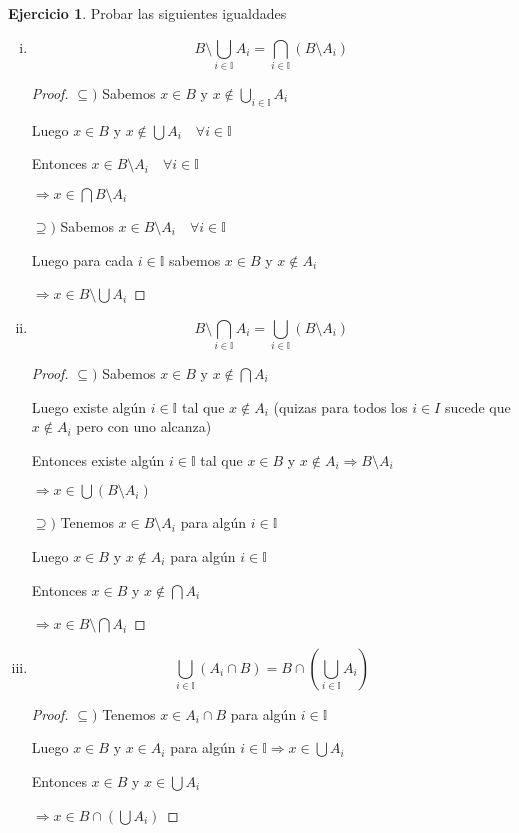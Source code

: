 \documentclass[12pt]{article}
\newcommand{\I}{\mathbb{I}}
\newcommand{\Ra}{\Rightarrow}
\theoremstyle{definition}
\newtheorem{ej}{Ejercicio}
\begin{document}
\noindent

\begin{ej} Probar las siguientes igualdades
\begin{enumerate}[i.]
  \item $$B \setminus \bigcup_{i \in \I} A_{i} = \bigcap_{i \in \I} (B \setminus A_{i})$$
    \begin{proof}
    
    $\subseteq )$ Sabemos $x \in B $ y $x \notin \bigcup_{i \in \I} A_{i}$ 

    Luego $x \in B$ y $x \notin \bigcup A_{i} \quad \forall i \in \I $

    Entonces $x \in B \setminus A_{i} \quad \forall i \in \I$

    $\Ra x \in \bigcap B \setminus A_{i}$

    $\supseteq )$ Sabemos $x \in B \setminus A_{i} \quad \forall i \in \I$

    Luego para cada $i \in \I$ sabemos $x \in B$ y $x \notin A_{i}$

    $\Ra x \in B \setminus \bigcup A_{i}$
    
    \end{proof}
  \item $$B \setminus \bigcap_{i \in \I} A_{i} = \bigcup_{i \in \I} (B \setminus A_{i})$$
    \begin{proof}

    	$\subseteq )$ Sabemos $x \in B $ y $x \notin \bigcap A_{i}$ 

    	Luego existe algún $i \in \I$ tal que $x \notin A_{i}$ (quizas para todos los $i \in I$ sucede que $x \notin A_{i}$ pero con uno alcanza)

    	Entonces existe algún $i \in \I$ tal que $x \in B$ y $x \notin A_{i} \Ra B \setminus A_{i} $

    	$\Ra x \in \bigcup (B \setminus A_{i})$

    	$\supseteq )$ Tenemos $x \in B \setminus A_{i}$ para algún $i \in \I$

    	Luego $x \in B$ y $x \notin A_{i}$ para algún $i \in \I$

    	Entonces $x \in B$ y $x \notin \bigcap A_{i}$

    	$\Ra x \in B \setminus \bigcap A_{i}$
    
    \end{proof}
  \item $$\bigcup_{i \in \I} (A_{i} \cap B) = B \cap (\bigcup_{i \in \I} A_{i})$$
    \begin{proof}
    $\subseteq )$ Tenemos $x \in A_{i} \cap B$ para algún $i \in \I$  
    
    Luego $x \in B$ y $x \in A_{i}$ para algún $i \in \I \Ra x \in \bigcup A_{i}$

    Entonces $x \in B$ y $x \in \bigcup A_{i}$

    $\Ra x \in B \cap (\bigcup A_{i})$
    \end{proof}
\end{enumerate}
\end{ej}
\newpage
\noindent
\end{document}
